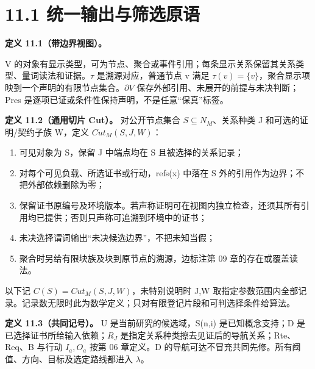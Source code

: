 \documentclass[UTF8,a4paper,zihao=-4,fontset=windows,openany]{ctexbook}
\newcommand{\mcsdisplay}[1]{%
  \par\addvspace{0.7em}%
  \sbox{\mcsmathbox}{\ensuremath{\displaystyle #1}}%
  \ifdim\wd\mcsmathbox>\linewidth
    \noindent\resizebox{\linewidth}{!}{\usebox{\mcsmathbox}}%
  \else
    \noindent\hspace*{\fill}\usebox{\mcsmathbox}\hspace*{\fill}%
  \fi
  \par\addvspace{0.7em}%
}
\def\ensuremath#1{#1}%
\def\mathrm#1{#1}%
\begin{document}
\section{11.1 统一输出与筛选原语}
\textbf{定义 11.1（带边界视图）。}


\mcsdisplay{Loc_\lambda(M)=(V,\partial V,\tau,Pres).}
\noindent V 的对象有显示类型，可为节点、聚合或事件引用；每条显示关系保留其关系类型、量词读法和证据。\(\tau\) 是溯源对应，普通节点 v 满足 \(\tau(v)=\{v\}\)，聚合显示项映到一个声明的有限节点集合。\(\partial V\) 保存外部引用、未展开的前提与未决判断；Pres 是逐项已证或条件性保持声明，不是任意“保真”标签。

\textbf{定义 11.2（通用切片 Cut）。} 对公开节点集合 \(S\subseteq N_M\)、关系种类 J 和可选的证明/契约子族 W，定义 \(\mathrm{Cut}_M(S,J,W)\)：

\begin{enumerate}
\item 可见对象为 S，保留 J 中端点均在 S 且被选择的关系记录；
\item 对每个可见负载、所选证书或行动，refs(x) 中落在 S 外的引用作为边界；不把外部依赖删除为零；
\item 保留证书原编号及环境版本。若声称证明可在视图内独立检查，还须其所有引用均已提供；否则只声称可追溯到环境中的证书；
\item 未决选择谓词输出“未决候选边界”，不把未知当假；
\item 聚合时另给有限块族及块到原节点的溯源，边标注第 09 章的存在或覆盖读法。
\end{enumerate}
以下记 \(C(S)=\mathrm{Cut}_M(S,J,W)\)，未特别说明时 J,W 取指定参数范围内全部记录。记录数无限时此为数学定义；只对有限登记片段和可判选择条件给算法。

\textbf{定义 11.3（共同记号）。} U 是当前研究的候选域，S(n,i) 是已知概念支持；D 是已选择证书所给输入依赖；\(R_J\) 是指定关系种类擦去见证后的导航关系；Rte、Req、B 与行动 \(I_a,O_a\) 按第 06 章定义。D 的导航可达不冒充共同先修。所有阈值、方向、目标及选定路线都进入 \(\lambda\)。
\end{document}
